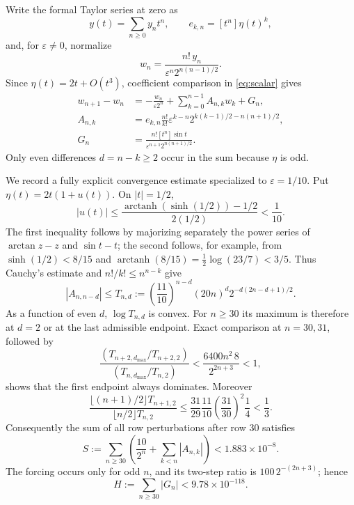 \documentclass[11pt]{article}
\newcommand{\e}{\varepsilon}
\begin{document}
Write the formal Taylor series at zero as
\[
 y(t)=\sum_{n\ge0}y_nt^n,
 \qquad e_{k,n}=[t^n]\eta(t)^k,
\]
and, for $\e\ne0$, normalize
\begin{equation}\label{eq:wdef}
 w_n=\frac{n!\,y_n}{\e^n2^{n(n-1)/2}}.
\end{equation}
Since $\eta(t)=2t+O(t^3)$, coefficient comparison in
\eqref{eq:scalar} gives
\begin{align}
 w_{n+1}-w_n
 &=-\frac{w_n}{\e2^n}
   +\sum_{k=0}^{n-1}A_{n,k}w_k+G_n,\label{eq:wrec}\\
 A_{n,k}
 &=e_{k,n}\frac{n!}{k!}\e^{k-n}
   2^{k(k-1)/2-n(n+1)/2},\label{eq:Ank}\\
 G_n&=\frac{n![t^n]\sin t}{\e^{n+1}2^{n(n+1)/2}}.\label{eq:Gn}
\end{align}
Only even differences $d=n-k\ge2$ occur in the sum because $\eta$ is odd.

We record a fully explicit convergence estimate specialized to
$\e=1/10$.  Put $\eta(t)=2t(1+u(t))$.  On $|t|=1/2$,
\begin{equation}\label{eq:ubound}
 |u(t)|\le
 \frac{\operatorname{arctanh}(\sinh(1/2))-1/2}{2(1/2)}<\frac1{10}.
\end{equation}
The first inequality follows by majorizing separately the power series of
$\arctan z-z$ and $\sin t-t$; the second follows, for example, from
$\sinh(1/2)<8/15$ and
$\operatorname{arctanh}(8/15)=\tfrac12\log(23/7)<3/5$.
Thus Cauchy's estimate and $n!/k!\le n^{n-k}$ give
\begin{equation}\label{eq:Tnd}
 |A_{n,n-d}|\le T_{n,d}:=\left(\frac{11}{10}\right)^{n-d}
 (20n)^d2^{-d(2n-d+1)/2}.
\end{equation}
As a function of even $d$, $\log T_{n,d}$ is convex.  For $n\ge30$ its
maximum is therefore at $d=2$ or at the last admissible endpoint.  Exact
comparison at $n=30,31$, followed by
\[
 \frac{(T_{n+2,d_{\max}}/T_{n+2,2})}
 {(T_{n,d_{\max}}/T_{n,2})}
 <\frac{6400n^2\,8}{2^{2n+3}}<1,
\]
shows that the first endpoint always dominates.  Moreover
\begin{equation}\label{eq:georatio}
 \frac{\lfloor(n+1)/2\rfloor T_{n+1,2}}
 {\lfloor n/2\rfloor T_{n,2}}
 \le \frac{31}{29}\frac{11}{10}
       \left(\frac{31}{30}\right)^2\frac14<\frac13.
\end{equation}
Consequently the sum of all row perturbations after row 30 satisfies
\begin{equation}\label{eq:Rtail}
 S:=\sum_{n\ge30}\left(\frac{10}{2^n}+
       \sum_{k<n}|A_{n,k}|\right)
 <1.883\times10^{-8}.
\end{equation}
The forcing occurs only for odd $n$, and its two-step ratio is
$100\,2^{-(2n+3)}$; hence
\begin{equation}\label{eq:Ftail}
 H:=\sum_{n\ge30}|G_n|<9.78\times10^{-118}.
\end{equation}
\end{document}
